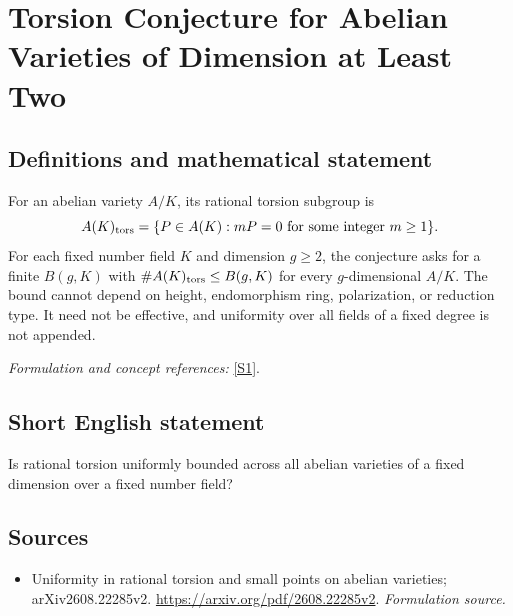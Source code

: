 \documentclass[11pt]{article}
\begin{document}
\section*{\texorpdfstring{Torsion Conjecture for Abelian Varieties of Dimension at Least Two}{Torsion Conjecture for Abelian Varieties of Dimension at Least Two}}\label{statement}
\subsection{Definitions and mathematical statement}
For an abelian variety $A/K$, its rational torsion subgroup is
\[
 A(K)_{\rm tors}=\{P\in A(K):mP=0\text{ for some integer }m\ge1\}.
\]
For each fixed number field $K$ and dimension $g\ge2$, the conjecture asks for a finite $B(g,K)$ with $\#A(K)_{\rm tors}\le B(g,K)$ for every $g$-dimensional $A/K$. The bound cannot depend on height, endomorphism ring, polarization, or reduction type. It need not be effective, and uniformity over all fields of a fixed degree is not appended.
\par\smallskip\textit{Formulation and concept references:} \href{https://arxiv.org/pdf/2608.22285v2}{[S1]}.

\subsection{Short English statement}
Is rational torsion uniformly bounded across all abelian varieties of a fixed dimension over a fixed number field?
\subsection{Sources}
\begin{itemize}
\item[S1]Uniformity in rational torsion and small points on abelian varieties; arXiv2608.22285v2.
\url{https://arxiv.org/pdf/2608.22285v2}.
\textit{Formulation source.}
\end{itemize}
\end{document}
